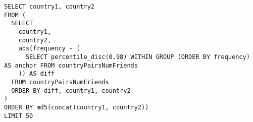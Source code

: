 \begin{lstlisting}[label=lst:q14-parameter-generation,caption=Parameter generation SQL query for Q14\variantA.]
SELECT country1, country2
FROM (
  SELECT
    country1,
    country2,
    abs(frequency - (
      SELECT percentile_disc(0.98) WITHIN GROUP (ORDER BY frequency) AS anchor FROM countryPairsNumFriends
    )) AS diff
  FROM countryPairsNumFriends
  ORDER BY diff, country1, country2
)
ORDER BY md5(concat(country1, country2))
LIMIT 50
\end{lstlisting}
